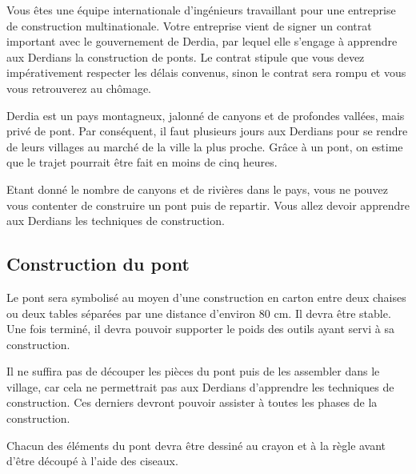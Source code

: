 \documentclass[11pt,a4paper]{article}
\begin{document}
Vous êtes une équipe internationale d'ingénieurs travaillant pour une entreprise de construction multinationale.
Votre entreprise vient de signer un contrat important avec le gouvernement de Derdia, par lequel elle s'engage à apprendre aux Derdians la construction de ponts.
Le contrat stipule que vous devez impérativement respecter les délais convenus, sinon le contrat sera rompu et vous vous retrouverez au chômage.

Derdia est un pays montagneux, jalonné de canyons et de profondes vallées, mais privé de pont.
Par conséquent, il faut plusieurs jours aux Derdians pour se rendre de leurs villages au marché de la ville la plus proche. Grâce à un pont, on estime que le trajet pourrait être fait en moins de cinq heures.

Etant donné le nombre de canyons et de rivières dans le pays, vous ne pouvez vous contenter de construire un pont puis de repartir.
Vous allez devoir apprendre aux Derdians les techniques de construction.

\subsection{Construction du pont}

Le pont sera symbolisé au moyen d'une construction en carton entre deux chaises ou deux tables séparées par une distance d'environ 80 cm.
Il devra être stable. Une fois terminé, il devra pouvoir supporter le poids des outils ayant servi à sa construction.

Il ne suffira pas de découper les pièces du pont puis de les assembler dans le village, car cela ne permettrait pas aux Derdians d'apprendre les techniques de construction.
Ces derniers devront pouvoir assister à toutes les phases de la construction.

Chacun des éléments du pont devra être dessiné au crayon et à la règle avant d'être découpé à l'aide des ciseaux.
\end{document}
